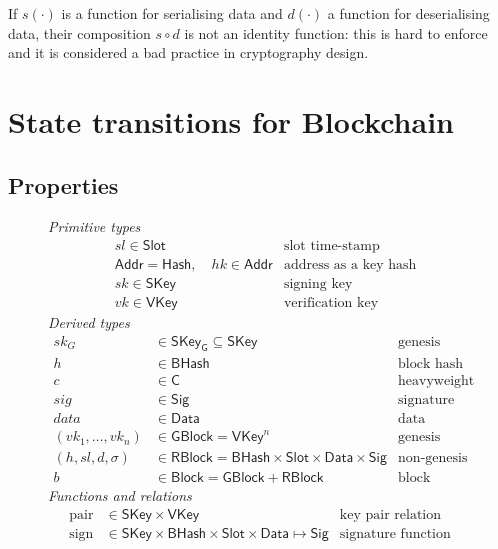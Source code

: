 \documentclass[11pt,a4paper]{article}
\newcommand{\type}[1]{\mathsf{#1}}
\newcommand{\Hash}{\type{Hash}}    %
\newcommand{\BHash}{\type{BHash}}  %
\newcommand{\Addr}{\type{Addr}}
\newcommand{\Slot}{\type{Slot}}
\newcommand{\GBlock}{\type{GBlock}}
\newcommand{\RBlock}{\type{RBlock}}
\newcommand{\Block}{\type{Block}}
\newcommand{\HCert}{\type{C}}
\newcommand{\SKey}{\type{SKey}}
\newcommand{\SKeyGen}{\type{SKey_G}}
\newcommand{\VKey}{\type{VKey}}
\newcommand{\Sig}{\type{Sig}}
\newcommand{\Data}{\type{Data}}
\newcommand{\signname}{sign}
\newcommand{\keypairname}{pair}
\begin{document}
If $s(\cdot)$ is a function for serialising data and $d(\cdot)$ a function for
deserialising data, their composition $s \circ d$ is not an identity function:
this is hard to enforce and it is considered a bad practice in cryptography
design.

\section{State transitions for Blockchain}
\label{sec:state-trans-chain}

\subsection{Properties}
\label{sec:chain-properties}

\begin{figure}[h]
  \emph{Primitive types}
  \begin{align*}
    & sl \in \Slot & \text{slot time-stamp}\\
    & \Addr = \Hash,\quad hk \in \Addr & \text{address as a key hash}\\
    & sk \in \SKey & \text{signing key}\\
    & vk \in \VKey & \text{verification key}
  \end{align*}
  \emph{Derived types}
  \begin{align*}
    sk_G & \in \SKeyGen \subseteq \SKey & \text{genesis block's signing key}\\
    h & \in \BHash & \text{block hash}\\
    c & \in \HCert & \text{heavyweight delegation certificate}\\
    sig & \in \Sig  & \text{signature}\\
    data & \in \Data  & \text{data}\\
    (vk_1, \dotsc, vk_n) & \in \GBlock = \VKey^n & \text{genesis block} \\
    (h, sl, d, \sigma) & \in \RBlock = \BHash \times \Slot \times \Data \times \Sig
      & \text{non-genesis block} \\
    b & \in \Block = \GBlock + \RBlock & \text{block}
  \end{align*}
  \emph{Functions and relations}
  \begin{align*}
    \text{\keypairname} & \in \SKey \times \VKey & \text{key pair relation}\\
    \text{\signname} & \in \SKey \times \BHash \times \Slot \times \Data \mapsto \Sig
      & \text{signature function}\\

\end{align*}
\end{figure}
\end{document}
